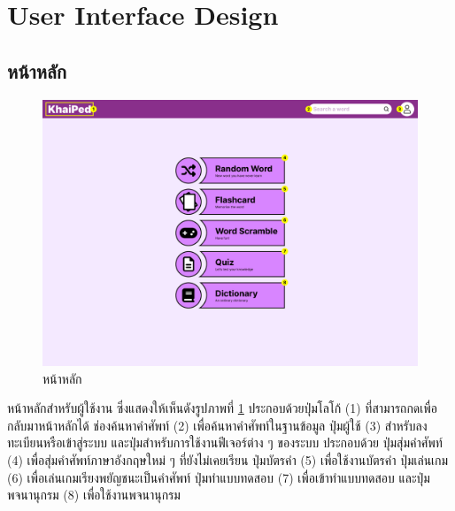 \documentclass[12pt,oneside,openright,a4paper]{cpe-thai-project}
\begin{document}
\pagebreak
\section{User Interface Design} \label{ssec:UI}
\subsection{หน้าหลัก}
\begin{figure}[!h]\centering
	\includegraphics[width=\textwidth, keepaspectratio=true]{image/chap3/ui/Home page.png}
	\caption{หน้าหลัก}\label{fig:UI_Home}
\end{figure}
\hspace{1cm}
หน้าหลักสำหรับผู้ใช้งาน ซึ่งแสดงให้เห็นดังรูปภาพที่ \ref{fig:UI_Home} ประกอบด้วยปุ่มโลโก้ (1) ที่สามารถกดเพื่อกลับมาหน้าหลักได้ ช่องค้นหาคำศัพท์ (2) เพื่อค้นหาคำศัพท์ในฐานข้อมูล
ปุ่มผู้ใช้ (3) สำหรับลงทะเบียนหรือเข้าสู่ระบบ และปุ่มสำหรับการใช้งานฟีเจอร์ต่าง ๆ ของระบบ ประกอบด้วย
ปุ่มสุ่มคำศัพท์ (4) เพื่อสุ่มคำศัพท์ภาษาอังกฤษใหม่ ๆ ที่ยังไม่เคยเรียน ปุ่มบัตรคำ (5) เพื่อใช้งานบัตรคำ ปุ่มเล่นเกม (6) เพื่อเล่นเกมเรียงพยัญชนะเป็นคำศัพท์
ปุ่มทำแบบทดสอบ (7) เพื่อเข้าทำแบบทดสอบ และปุ่มพจนานุกรม (8) เพื่อใช้งานพจนานุกรม

\pagebreak
\end{document}
